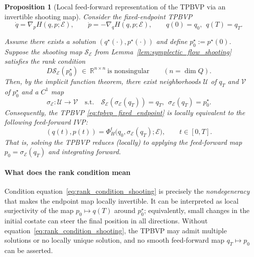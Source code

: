 \documentclass{article} %
\def\eqref#1{equation~\ref{#1}}
\newtheorem{proposition}[theorem]{Proposition}
\begin{document}
\begin{proposition}[Local feed-forward representation of the TPBVP via an invertible shooting map]
\label{prop:tpbvp_feedforward_by_ift}
Consider the fixed-endpoint TPBVP
\begin{equation}
\label{eq:tpbvp_fixed_endpoint}
\dot q=\nabla_p H(q,p;\mathcal E),\qquad
\dot p=-\nabla_q H(q,p;\mathcal E),\qquad
q(0)=q_0,\ \ q(T)=q_T.
\end{equation}




Assume there exists a solution $(q^\star(\cdot),p^\star(\cdot))$ and define $p_0^\star:=p^\star(0)$.
Suppose the shooting map $\mathcal S_{\mathcal E}$ from Lemma~\ref{lem:symplectic_flow_shooting} satisfies the rank condition
\begin{equation}
\label{eq:rank_condition_shooting}
D\mathcal S_{\mathcal E}(p_0^\star)\ \in\ \mathbb R^{n\times n}\ \text{is nonsingular}\qquad (n=\dim Q).
\end{equation}
Then, by the implicit function theorem, there exist neighborhoods $\mathcal U$ of $q_T$ and $\mathcal V$ of $p_0^\star$
and a $C^1$ map
\[
\sigma_{\mathcal E}:\mathcal U\to \mathcal V
\quad\text{s.t.}\quad
\mathcal S_{\mathcal E}(\sigma_{\mathcal E}(q_T))=q_T,\ \ \sigma_{\mathcal E}(q_T)=p_0^\star.
\]
Consequently, the TPBVP \cref{eq:tpbvp_fixed_endpoint} is locally equivalent to the following \emph{feed-forward IVP}:
\[
(q(t),p(t))=\Phi_H^{t}\big(q_0,\sigma_{\mathcal E}(q_T);\mathcal E\big),\qquad t\in[0,T].
\]
That is, solving the TPBVP reduces (locally) to applying the feed-forward map $p_0=\sigma_{\mathcal E}(q_T)$ and integrating forward.
\end{proposition}

\paragraph{What does the rank condition mean}
Condition \eqref{eq:rank_condition_shooting} is precisely the \emph{nondegeneracy} that makes the endpoint map locally invertible.
It can be interpreted as local surjectivity of the map $p_0\mapsto q(T)$ around $p_0^\star$; equivalently,
small changes in the initial costate can steer the final position in all directions.
Without \eqref{eq:rank_condition_shooting}, the TPBVP may admit multiple solutions or no locally unique solution, and no smooth
feed-forward map $q_T\mapsto p_0$ can be asserted.
\end{document}
